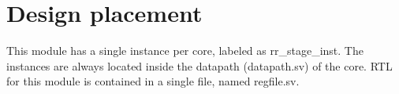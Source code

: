 \section{Design placement}
\label{chapter2}

This module has a single instance per core, labeled as rr\_stage\_inst. The instances are always located inside the datapath (datapath.sv) of the core.
RTL for this module is contained in a single file, named regfile.sv. 


